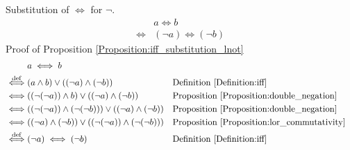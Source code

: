 \begin{prop}
\label{Proposition:iff_substitution_lnot}
Substitution of $\iff$ for $\lnot$.
\begin{align*}
& a \iff b \\
\iff & (\lnot a) \iff (\lnot b)
\end{align*}
Proof of Proposition \ref{Proposition:iff_substitution_lnot}
\begin{align*}
& a \iff b \\
\overset{\operatorname{def}}{\iff} & (a \land b) \lor ((\lnot a) \land (\lnot b))
& & \text{Definition \ref{Definition:iff}} \\
\iff & ((\lnot (\lnot a)) \land b) \lor ((\lnot a) \land (\lnot b))
& & \text{Proposition \ref{Proposition:double_negation}} \\
\iff & ((\lnot (\lnot a)) \land (\lnot (\lnot b))) \lor ((\lnot a) \land (\lnot b))
& & \text{Proposition \ref{Proposition:double_negation}} \\
\iff & ((\lnot a) \land (\lnot b)) \lor ((\lnot (\lnot a)) \land (\lnot (\lnot b)))
& & \text{Proposition \ref{Proposition:lor_commutativity}} \\
\overset{\operatorname{def}}{\iff} & (\lnot a) \iff (\lnot b)
& & \text{Definition \ref{Definition:iff}} \\
\end{align*}
\end{prop}

